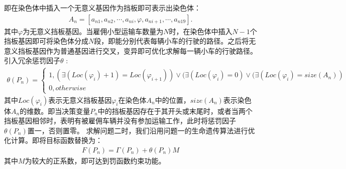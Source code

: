 \documentclass{whutmod}
\begin{document}
      即在染色体中插入一个无意义基因作为挡板即可表示出染色体：
      \begin{gather*}
      A_n=[a_{n1},a_{n2},\cdots,a_{ni},\varphi ,a_{ni+1},\cdots,a_{n19}].
      \end{gather*}
      其中$\varphi$为无意义挡板基因。当雇佣小型运输车数量为$N$时，在染色体中插入$N-1$个挡板基因即可将染色体分成$N$段，即能分别代表每辆小车的行驶的路径。之后将无意义挡板基因作为普通基因进行交叉，变异即可优化求解每一辆小车的行驶路径。引入冗余惩罚因子$\theta$ :
      \begin{gather}
      \theta(P_n)=\left\{\begin{matrix}1,(\exists (Loc(\varphi_i )+1)=Loc(\varphi_{i+1} ))\vee  (\exists (Loc(\varphi_i )=0)\vee (\exists (Loc(\varphi_i )=size(A_n))
      \\ 0,otherwise
      \end{matrix}\right.
      \end{gather}
      其中$Loc(\varphi_i )$表示无意义挡板基因$\varphi_i$在染色体$A_n$中的位置，$size(A_n)$表示染色体$A_n$的维数。即当决策变量$P_n$中的挡板基因存在于其开头或末尾时，或者当两个挡板基因相邻时，表明有被雇佣车辆并没有参加运输工作，此时将惩罚因子$\theta(P_n)$置一，否则置零。 求解问题二时，我们沿用问题一的生命遗传算法进行优化计算。即将目标函数替换为：
      \begin{gather}
      F(P_n)= \Gamma (P_n)+\theta(P_n)M
      \end{gather}
      其中$M$为较大的正系数，即可达到罚函数约束功能。
    
    
\end{document}
